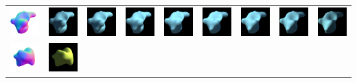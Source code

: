\begin{center}
\begin{longtable}{@{}c@{}c@{}c@{}c@{}c@{}c@{}c@{}c@{}c@{}}
\includegraphics[width=0.1\linewidth]{training/26_gt.png} & \includegraphics[width=0.1\linewidth]{training/26_0.png} &
\includegraphics[width=0.1\linewidth]{training/26_1.png} & \includegraphics[width=0.1\linewidth]{training/26_2.png} &
\includegraphics[width=0.1\linewidth]{training/26_3.png} & \includegraphics[width=0.1\linewidth]{training/26_4.png} &
\includegraphics[width=0.1\linewidth]{training/26_5.png} & \includegraphics[width=0.1\linewidth]{training/26_6.png} &
\includegraphics[width=0.1\linewidth]{training/26_7.png} \\
\includegraphics[width=0.1\linewidth]{training/27_gt.png} & \includegraphics[width=0.1\linewidth]{training/27_0.png} &

\end{longtable}
\end{center}
